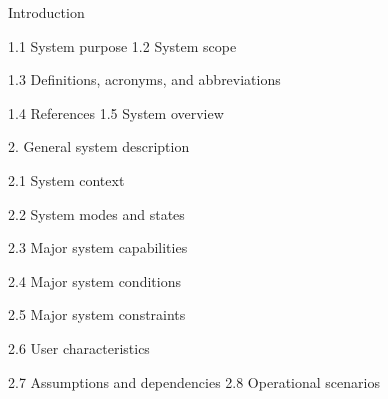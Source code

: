 Introduction 

1.1 System purpose 
1.2 System scope 

1.3 Definitions, acronyms, and 
abbreviations 

1.4 References 
1.5 System overview 

2. General system description 

2.1 System context 

2.2 System modes and states 

2.3 Major system capabilities 

2.4 Major system conditions 

2.5 Major system constraints 

2.6 User characteristics 

2.7 Assumptions and dependencies 
2.8 Operational scenarios